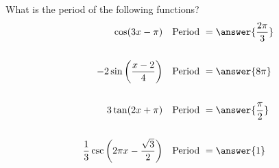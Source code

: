 \documentclass{ximera}
\author{Bobby Ramsey}
\begin{document}
\begin{exercise}

	What is the period of the following functions?
	\begin{align*}
		\cos(3x-\pi) \,\, &\,\, \text{ Period } = \answer{\frac{2\pi}{3}} \\ \\
		-2\sin\left(\frac{x-2}{4}\right) \,\, &\,\, \text{ Period } = \answer{8\pi} \\ \\
		3\tan(2x+ \pi) \,\, &\,\, \text{ Period } = \answer{\frac{\pi}{2}} \\ \\
		\frac{1}{3}\csc\left(2\pi x - \frac{\sqrt{3}}{2}\right) \,\, &\,\, \text{ Period } = \answer{1}
	\end{align*}

\end{exercise}
\end{document}
